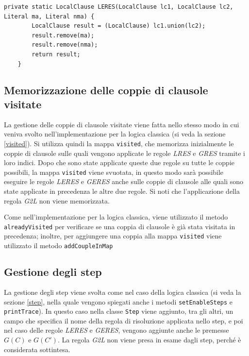 \documentclass[a4paper,12pt]{report}
\begin{document}
\begin{minipage}{\linewidth}
    \small
    \begin{lstlisting}[caption={Metodo \texttt{LERES} della classe \texttt{Resolution}}, label={method:LERES}]
    private static LocalClause LERES(LocalClause lc1, LocalClause lc2, Literal ma, Literal nma) {
        LocalClause result = (LocalClause) lc1.union(lc2);
        result.remove(ma);
        result.remove(nma);
        return result;
    }
    \end{lstlisting}
\end{minipage}

\subsection*{Memorizzazione delle coppie di clausole visitate}
La gestione delle coppie di clausole visitate viene fatta nello stesso modo in cui veniva svolto nell'implementazione per la logica classica (si veda la sezione \ref{visited}). Si utilizza quindi la mappa \texttt{visited}, che memorizza inizialmente le coppie di clausole sulle quali vengono applicate le regole \emph{LRES} e \emph{GRES} tramite i loro indici. Dopo che sono state applicate queste due regole su tutte le coppie possibili, la mappa \texttt{visited} viene svuotata, in questo modo sarà possibile eseguire le regole \emph{LERES} e \emph{GERES} anche sulle coppie di clausole alle quali sono state applicate in precedenza le altre due regole. Si noti che l'applicazione della regola \emph{G2L} non viene memorizzata.

Come nell'implementazione per la logica classica, viene utilizzato il metodo \\ \texttt{alreadyVisited} per verificare se una coppia di clausole è già stata visitata in precedenza; inoltre, per aggiungere una coppia alla mappa \texttt{visited} viene utilizzato il metodo \texttt{addCoupleInMap}

\subsection{Gestione degli step}
La gestione degli step viene svolta come nel caso della logica classica (si veda la sezione \ref{step}, nella quale vengono spiegati anche i metodi \texttt{setEnableSteps} e \texttt{printTrace}). In questo caso nella classe \texttt{Step} viene aggiunto, tra gli altri, un campo che specifica il nome della regola di risoluzione applicata nello step, e poi nel caso delle regole \emph{LERES} e \emph{GERES}, vengono aggiunte anche le premesse $G(C)$ e $G(C')$. La regola \emph{G2L} non viene presa in esame dagli step, perché è considerata sottintesa.
\end{document}
